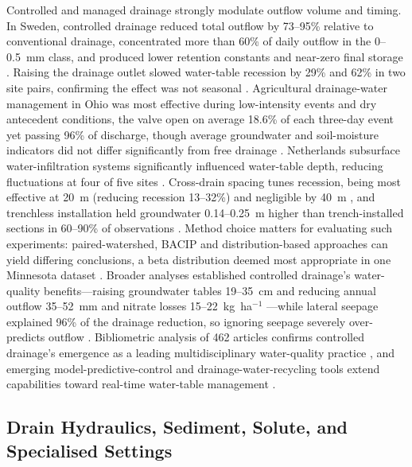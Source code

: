 \documentclass[11pt]{article}
\begin{document}
Controlled and managed drainage strongly modulate outflow volume and timing. In Sweden, controlled drainage reduced total outflow by 73--95\% relative to conventional drainage, concentrated more than 60\% of daily outflow in the 0--0.5~mm class, and produced lower retention constants and near-zero final storage \parencite{Wesström2003}. Raising the drainage outlet slowed water-table recession by 29\% and 62\% in two site pairs, confirming the effect was not seasonal \parencite{Saadat2017}. Agricultural drainage-water management in Ohio was most effective during low-intensity events and dry antecedent conditions, the valve open on average 18.6\% of each three-day event yet passing 96\% of discharge, though average groundwater and soil-moisture indicators did not differ significantly from free drainage \parencite{Miller2022}. Netherlands subsurface water-infiltration systems significantly influenced water-table depth, reducing fluctuations at four of five sites \parencite{vandeCraats2025}. Cross-drain spacing tunes recession, being most effective at 20~m (reducing recession 13--32\%) and negligible by 40~m \parencite{Vaiciukynas2015}, and trenchless installation held groundwater 0.14--0.25~m higher than trench-installed sections in 60--90\% of observations \parencite{Salo2019}. Method choice matters for evaluating such experiments: paired-watershed, BACIP and distribution-based approaches can yield differing conclusions, a beta distribution deemed most appropriate in one Minnesota dataset \parencite{Pagliari2021}. Broader analyses established controlled drainage's water-quality benefits---raising groundwater tables 19--35~cm and reducing annual outflow 35--52~mm and nitrate losses 15--22~kg~ha$^{-1}$ \parencite{Kesicka2023}---while lateral seepage explained 96\% of the drainage reduction, so ignoring seepage severely over-predicts outflow \parencite{Youssef2021,Saadat2018,Österholm2015}. Bibliometric analysis of 462 articles confirms controlled drainage's emergence as a leading multidisciplinary water-quality practice \parencite{Kesicka2023b}, and emerging model-predictive-control and drainage-water-recycling tools extend capabilities toward real-time water-table management \parencite{Ikonen2023,Reinhart2020,VandeCraats2021}.

\subsection{Drain Hydraulics, Sediment, Solute, and Specialised Settings}
\end{document}
